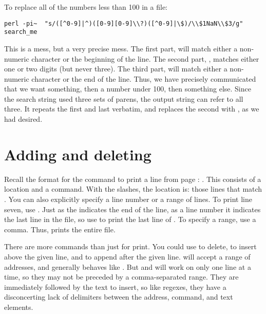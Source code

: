 To replace all of the numbers less than 100 in a file:
\begin{lstlisting}
perl -pi~  "s/([^0-9]|^)([0-9][0-9]\\?)([^0-9]|\$)/\\$1NaN\\$3/g" search_me
\end{lstlisting}
This is a mess, but a very precise mess. The first part,
\ci{([\that 0-9]|\that)} will match either a non-numeric character
or the beginning of the line. The second part,
,
matches either one or two digits (but never three). The third part, 
\ci{([\that0-9]|\$)} will match either a non-numeric character
or the end of the line. Thus, we have precisely communicated that we
want something, then a number under 100, then something else.
Since the search string used three sets of parens, the output string
can refer to all three. It repeats the first and last verbatim, and
replaces the second with , as we had desired.



\section{Adding and deleting}

Recall the format for the command to print a line from page
\pageref{sedintro}: . This consists of a location and a
command. With the slashes, the location is: those lines that match
. You can also explicitly specify a line number or a range
of lines. To print line seven, use . Just as the \ci{\$} indicates the
end of the line, as a line number it indicates the last line in the
file, so use  to print the last line of
.  To specify a range, use a comma. Thus, 
 prints the entire file.

There are more commands than just  for print. You could use 
to delete,  to insert above the given line, and  to append
after the given line.  will accept a range of
addresses, and generally behaves like .
But  and  will work on only one line at a time, so they may
not be preceded by a comma-separated range. They are immediately followed
by the text to insert, so like regexes, they have a disconcerting lack of
delimiters between the address, command, and text elements.


